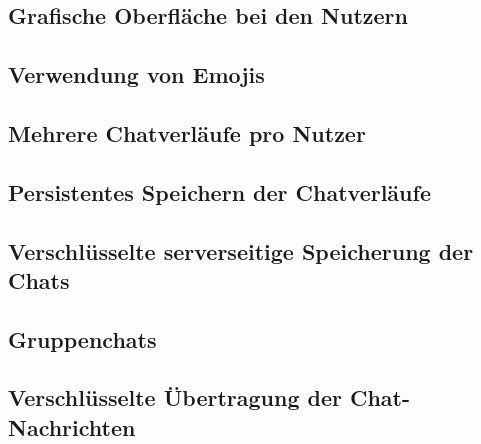 
\subsection{Grafische Oberfläche bei den Nutzern}

\subsection{Verwendung von Emojis}

\subsection{Mehrere Chatverläufe pro Nutzer}

\subsection{Persistentes Speichern der Chatverläufe}

\subsection{Verschlüsselte serverseitige Speicherung der Chats}

\subsection{Gruppenchats}

\subsection{Verschlüsselte Übertragung der Chat-Nachrichten}


